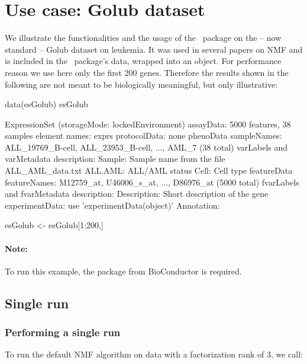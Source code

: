 \documentclass[a4paper]{article}
\newcommand{\nmfpack}{\code{NMF}\ }
\begin{document}
\section{Use case: Golub dataset}\label{sec:usecase}
We illustrate the functionalities and the usage of the \nmfpack package on the 
-- now standard -- Golub dataset on leukemia.
It was used in several papers on NMF \cite{Brunet04, Gao2005} and is included in 
the \nmfpack package's data, wrapped into an  object.
 For performance reason we use here only the first 200 genes. Therefore the results shown 
 in the following are not meant to be biologically meaningful, but only illustrative:

\begin{Schunk}
\begin{Sinput}
 data(esGolub)
 esGolub
\end{Sinput}
\begin{Soutput}
ExpressionSet (storageMode: lockedEnvironment)
assayData: 5000 features, 38 samples 
  element names: exprs 
protocolData: none
phenoData
  sampleNames: ALL_19769_B-cell, ALL_23953_B-cell, ..., AML_7  (38 total)
  varLabels and varMetadata description:
    Sample: Sample name from the file ALL_AML_data.txt
    ALL.AML: ALL/AML status
    Cell: Cell type
featureData
  featureNames: M12759_at, U46006_s_at, ..., D86976_at  (5000 total)
  fvarLabels and fvarMetadata description:
    Description: Short description of the gene
experimentData: use 'experimentData(object)'
Annotation:  
\end{Soutput}
\begin{Sinput}
 esGolub <- esGolub[1:200,]
\end{Sinput}
\end{Schunk}

\paragraph{Note:} To run this example, the  package from 
BioConductor is required.

\subsection{Single run}\label{sec:single_run}

\subsubsection{Performing a single run}
To run the default NMF algorithm on data  with a factorization rank 
of 3, we call: 
\end{document}

